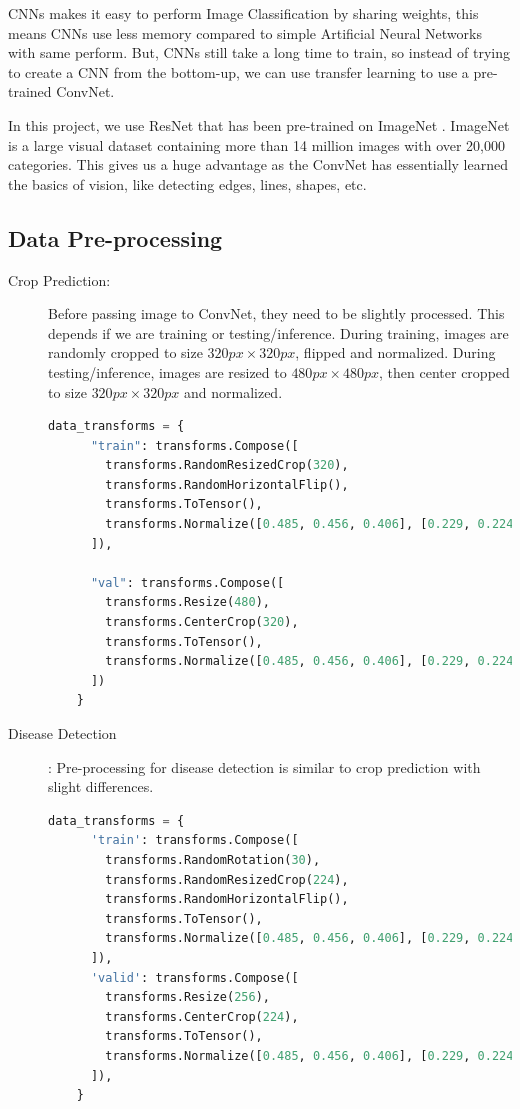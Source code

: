 \documentclass[../Report.tex]{subfiles}
\begin{document}
CNNs makes it easy to perform Image Classification by sharing weights, this means CNNs use less memory compared to simple Artificial Neural 
Networks with same perform. But, CNNs still take a long time to train, so instead of trying to create a CNN from the bottom-up, we can use 
transfer learning to use a pre-trained ConvNet.\par

In this project, we use ResNet that has been pre-trained on ImageNet \cite{imagenet}. ImageNet is a large visual dataset containing more than 
14 million images with over 20,000 categories. This gives us a huge advantage as the ConvNet has essentially learned the basics of vision, 
like detecting edges, lines, shapes, etc.\par

\subsection{Data Pre-processing}
\begin{description}
  \item[Crop Prediction:] Before passing image to ConvNet, they need to be slightly processed. This depends if we are training or 
  testing/inference. During training, images are randomly cropped to size $320px \times 320px$, flipped and normalized. 
  During testing/inference, images are resized to $480px \times 480px$, then center cropped to size $320px \times 320px$ and normalized.

  \begin{lstlisting}[language=python,caption={Crop Prediction Image Pre-processing},captionpos=b]
    data_transforms = {
      "train": transforms.Compose([
        transforms.RandomResizedCrop(320),
        transforms.RandomHorizontalFlip(),
        transforms.ToTensor(),
        transforms.Normalize([0.485, 0.456, 0.406], [0.229, 0.224, 0.225])
      ]),
      
      "val": transforms.Compose([
        transforms.Resize(480),
        transforms.CenterCrop(320),
        transforms.ToTensor(),
        transforms.Normalize([0.485, 0.456, 0.406], [0.229, 0.224, 0.225])
      ])
    }
  \end{lstlisting}

  \item[Disease Detection]: Pre-processing for disease detection is similar to crop prediction with slight differences.
  
  \begin{lstlisting}[language=python,caption={Disease Detection Image Pre-processing},captionpos=b]
    data_transforms = {
      'train': transforms.Compose([
        transforms.RandomRotation(30),
        transforms.RandomResizedCrop(224),
        transforms.RandomHorizontalFlip(),
        transforms.ToTensor(),
        transforms.Normalize([0.485, 0.456, 0.406], [0.229, 0.224, 0.225])
      ]),
      'valid': transforms.Compose([
        transforms.Resize(256),
        transforms.CenterCrop(224),
        transforms.ToTensor(),
        transforms.Normalize([0.485, 0.456, 0.406], [0.229, 0.224, 0.225])
      ]),
    }
  \end{lstlisting}

\end{description}
\end{document}
